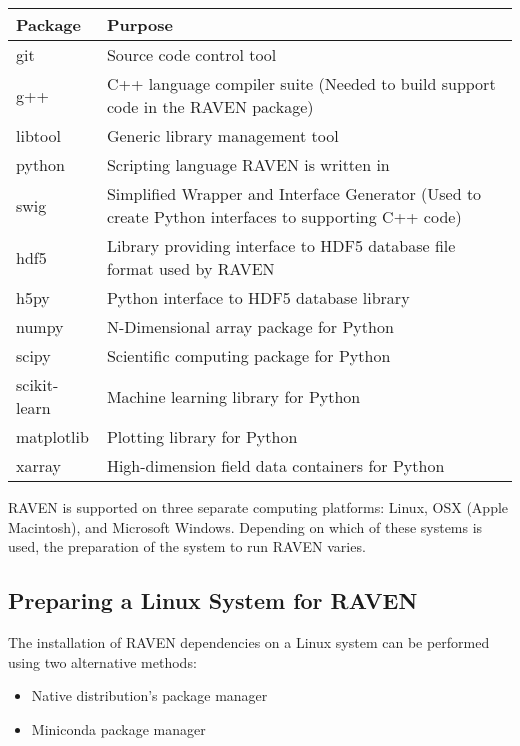 \begin{center}
    \begin{tabular}{ | l | p{10cm} |}
    \hline Package & Purpose \\
    \hline git & Source code control tool \\
    \hline g++ & C++ language compiler suite (Needed to build
        support code in the RAVEN package) \\
    \hline libtool & Generic library management tool \\
    \hline python & Scripting language RAVEN is written in \\
    \hline swig & Simplified Wrapper and Interface Generator
        (Used to create Python interfaces to supporting C++ code) \\
    \hline hdf5 & Library providing interface to HDF5 database
        file format used by RAVEN \\
    \hline h5py & Python interface to HDF5 database library \\
    \hline numpy & N-Dimensional array package for Python \\
    \hline scipy &  Scientific computing package for Python \\
    \hline scikit-learn & Machine learning library for Python \\
    \hline matplotlib & Plotting library for Python \\
    \hline xarray & High-dimension field data containers for Python \\
    \hline
    \end{tabular}
\end{center}


RAVEN is supported on three separate computing platforms:
Linux, OSX (Apple Macintosh), and Microsoft Windows.  Depending
on which of these systems is used, the preparation of the system
to run RAVEN varies.

\subsection{Preparing a Linux System for RAVEN}
\label{sysprep_linux}

The installation of RAVEN dependencies on a Linux system  can be performed
using two alternative methods:

\begin{itemize}
    \item Native distribution's package manager
    \item Miniconda package manager
\end{itemize}


